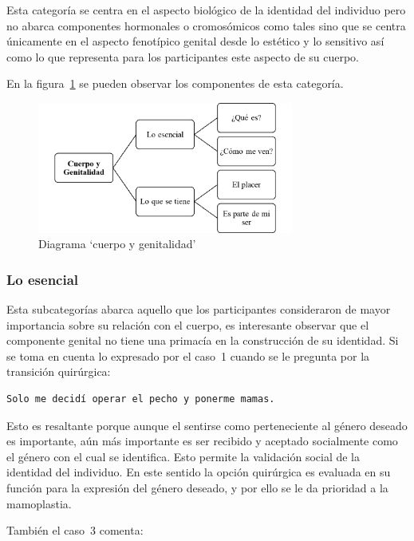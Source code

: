 Esta categoría se centra en el aspecto biológico de la identidad del individuo
pero no abarca componentes hormonales o cromosómicos como tales sino que se
centra únicamente en el aspecto fenotípico genital desde lo estético y lo
sensitivo así como lo que representa para los participantes este aspecto de su
cuerpo.

En la figura~\ref{fig:genitalidad} se pueden observar los componentes de esta
categoría.

\begin{figure}
    \centering
    \includegraphics[width=0.75\textwidth]{genitalidad}
    \caption{Diagrama ‘cuerpo y genitalidad’}\label{fig:genitalidad}
\end{figure}

\subsubsection{Lo esencial}

Esta subcategorías abarca aquello que los participantes consideraron de mayor
importancia sobre su relación con el cuerpo, es interesante observar que el
componente genital no tiene una primacía en la construcción de su identidad. Si
se toma en cuenta lo expresado por el caso~1 cuando se le pregunta por la
transición quirúrgica:

\begin{verbatim}
Solo me decidí operar el pecho y ponerme mamas.
\end{verbatim}

Esto es resaltante porque aunque el sentirse como perteneciente al género
deseado es importante, aún más importante es ser recibido y aceptado socialmente
como el género con el cual se identifica. Esto permite la validación social de la identidad del individuo. En este sentido la opción quirúrgica
es evaluada en su función para la expresión del género deseado, y por ello se le
da prioridad a la mamoplastia.

También el caso~3 comenta:

